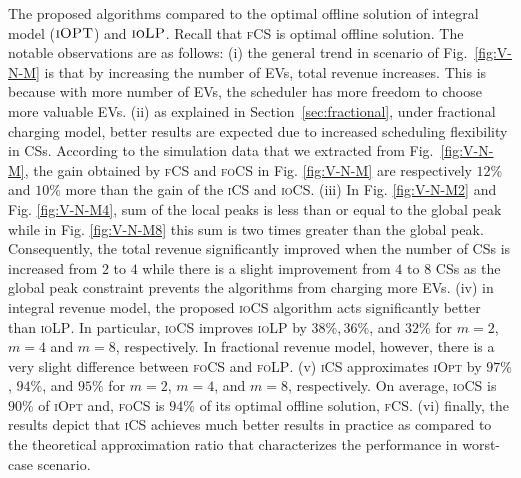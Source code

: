 \documentclass[journal]{IEEEtran}
\newcommand{\revv}[1]{{\color{black}#1}}%
\newcommand{\ics}{\textsc{iCS}\xspace}
\newcommand{\fcs}{\textsc{fCS}\xspace}
\newcommand{\focs}{\textsc{foCS}\xspace}
\newcommand{\iocs}{\textsc{ioCS}\xspace}
\newcommand{\iolp}{\textsc{ioLP}\xspace}
\newcommand{\folp}{\textsc{foLP}\xspace}
\begin{document}
The proposed algorithms compared to the optimal offline solution of integral model ($\textsc{iOPT}$) and $\iolp$.%
Recall that \fcs is optimal offline solution. The notable observations  are  as  follows:  (i)  the  general  trend in scenario of Fig.~\ref{fig:V-N-M} is that  by increasing  the  number  of  EVs,  total  revenue  increases.  This is because with more number of EVs, the scheduler has more freedom to choose more valuable EVs. (ii)  as  explained in Section~\ref{sec:fractional}, under fractional charging model, better results are expected due to increased scheduling flexibility in CSs. According to the simulation data that we extracted from Fig.~\ref{fig:V-N-M}, the gain obtained by \fcs and \focs in Fig. \ref{fig:V-N-M} are respectively \revv{$12\%$ and $10\%$} more than the gain of the \ics and \iocs. (iii) \revv{In Fig. \ref{fig:V-N-M2} and Fig. \ref{fig:V-N-M4}, sum of the local peaks is less than or equal to the global peak while in Fig. \ref{fig:V-N-M8} this sum is two times greater than the global peak. Consequently, the total revenue significantly improved when the number of CSs is increased from $2$ to $4$ while there is a slight improvement from $4$ to $8$ CSs as the global peak constraint prevents the algorithms from charging more EVs.}
 (iv) in integral revenue model, the proposed \iocs algorithm acts significantly better than \iolp. In particular, \iocs improves \iolp by \revv{$38\%, 36\%$, and $32\%$} for $m=2$, $m=4$ and $m=8$, respectively. \revv{In fractional revenue model, however, there is a very slight difference between \focs and \folp.}
(v) \ics approximates \textsc{iOpt} by \revv{$97\%$, $94\%$, and $95\%$} for $m=2$, $m=4$, and $m=8$, respectively. On average, \iocs is \revv{$90\%$} of \textsc{iOpt} and, \focs is \revv{$94\%$} of its optimal offline solution, \fcs.  
(vi) finally, the results depict that \ics achieves much better results in practice as compared to the theoretical approximation ratio that characterizes the performance in worst-case scenario.

\end{document}
